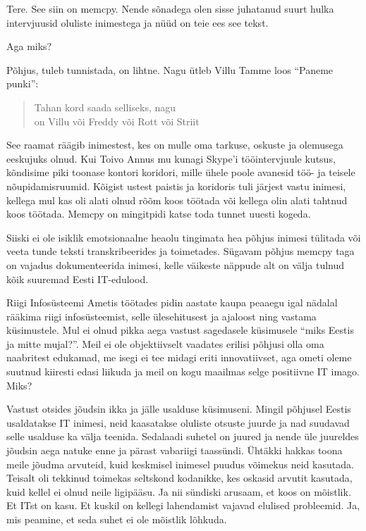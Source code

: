 Tere. See siin on memcpy. Nende sõnadega olen sisse juhatanud suurt hulka 
intervjuusid oluliste inimestega ja nüüd on teie ees see tekst. 

Aga miks? 

Põhjus, tuleb tunnistada, on lihtne. Nagu ütleb Villu Tamme loos 
\enquote{Paneme punki}:

\begin{verse}
Tahan kord saada selliseks, nagu \\
on Villu või Freddy või Rott või Striit\\
\end{verse}

See raamat räägib inimestest, kes on mulle oma tarkuse, oskuste ja olemusega 
eeskujuks olnud. Kui Toivo Annus mu kunagi Skype'i 
tööintervjuule kutsus, kõndisime piki toonase kontori koridori, mille ühele 
poole avanesid töö- ja teisele nõupidamisruumid. Kõigist ustest paistis ja 
koridoris tuli järjest vastu inimesi, kellega mul kas oli alati olnud rõõm koos 
töötada või kellega olin alati tahtnud koos töötada. Memcpy on mingitpidi 
katse toda tunnet uuesti kogeda.

Siiski ei ole isiklik emotsionaalne heaolu tingimata hea põhjus inimesi 
tülitada või veeta tunde teksti transkribeerides ja toimetades. Sügavam põhjus 
memcpy taga on vajadus dokumenteerida inimesi, kelle 
väikeste näppude alt on välja tulnud kõik suuremad Eesti IT-edulood. 

Riigi Infosüsteemi Ametis töötades pidin aastate 
kaupa peaaegu igal nädalal rääkima riigi infosüsteemist, selle ülesehitusest ja 
ajaloost ning vastama küsimustele. Mul ei olnud pikka aega vastust sagedasele 
küsimusele \enquote{miks Eestis ja mitte mujal?}. Meil ei ole objektiivselt 
vaadates erilisi põhjusi olla oma naabritest edukamad, me isegi ei tee midagi 
eriti innovatiivset, aga ometi oleme suutnud kiiresti edasi liikuda ja meil on 
kogu maailmas selge positiivne IT imago. Miks? 

Vastust otsides jõudsin ikka ja jälle usalduse küsimuseni. Mingil põhjusel Eestis usaldatakse 
IT inimesi, neid kaasatakse oluliste otsuste juurde ja nad suudavad 
selle usalduse ka välja teenida. Sedalaadi suhetel on juured ja nende üle 
juureldes jõudsin aega natuke enne ja pärast vabariigi taassündi. Ühtäkki 
hakkas toona meile jõudma arvuteid, kuid keskmisel inimesel puudus võimekus 
neid kasutada. Teisalt oli tekkinud toimekas seltskond kodanikke, kes oskasid 
arvutit kasutada, kuid kellel ei olnud neile ligipääsu. Ja nii sündiski 
arusaam, et koos on mõistlik. Et ITst on kasu. Et kuskil on kellegi 
lahendamist vajavad elulised probleemid. Ja, mis peamine, et seda suhet ei ole 
mõistlik lõhkuda. 

